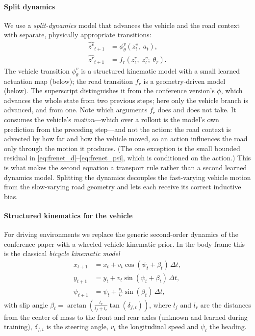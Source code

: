 \documentclass[preprint,12pt]{elsarticle}
\newcommand{\zv}{z^{v}}      %
\newcommand{\zr}{z^{r}}      %
\begin{document}
\paragraph{Split dynamics}
We use a \emph{split-dynamics} model that advances the vehicle and the road
context with separate, physically appropriate transitions:
\begin{align}
    \hat{\zv}_{t+1} &= \phi^{v}_\theta(\zv_t,\; a_t),
        \label{eq:split_vehicle}\\
    \hat{\zr}_{t+1} &= f_r(\zr_t,\; \zv_t;\; \theta_r).
        \label{eq:split_road}
\end{align}
The vehicle transition $\phi^{v}_\theta$ is a structured kinematic model with a
small learned actuation map (below); the road transition $f_r$ is a geometry-driven
model (below). The superscript distinguishes it from the conference version's
$\phi$, which advances the whole state from two previous steps; here only the
vehicle branch is advanced, and from one.
Note which arguments $f_r$ does and does not take.
It consumes the vehicle's \emph{motion}---which over a rollout is the model's
own prediction from the preceding step---and not the action: the road context
is advected by how far and how the vehicle moved, so an action influences the
road only through the motion it produces.
(The one exception is the small bounded residual in
\eqref{eq:frenet_d}--\eqref{eq:frenet_psi}, which is conditioned on the
action.)
This is what makes the second equation a transport rule rather than a second
learned dynamics model.
Splitting the dynamics decouples the fast-varying vehicle motion from the
slow-varying road geometry and lets each receive its correct inductive bias.

\paragraph{Structured kinematics for the vehicle}
For driving environments we replace the generic second-order dynamics of the
conference paper with a wheeled-vehicle kinematic prior.
In the body frame this is the classical \emph{bicycle kinematic model}
\begin{align}
    x_{t+1}    &= x_t    + v_t\cos(\psi_t + \beta_t)\,\Delta t,
    \label{eq:bic_x}\\
    y_{t+1}    &= y_t    + v_t\sin(\psi_t + \beta_t)\,\Delta t,
    \label{eq:bic_y}\\
    \psi_{t+1} &= \psi_t + \frac{v_t}{l_r}\sin(\beta_t)\,\Delta t,
    \label{eq:bic_psi}
\end{align}
with slip angle
$\beta_t = \arctan\!\left(\frac{l_r}{l_f + l_r}\tan(\delta_{f,t})\right)$, where
$l_f$ and $l_r$ are the distances from the center of mass to the front and rear
axles (unknown and learned during training), $\delta_{f,t}$ is the steering
angle, $v_t$ the longitudinal speed and $\psi_t$ the heading.
\end{document}
